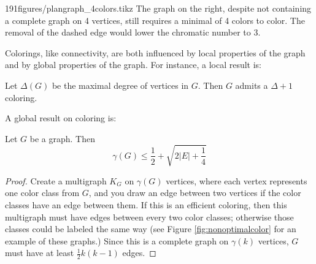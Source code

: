 \begin{examplefigureenv}{191figures/plangraph_4colors.tikz}
  The graph on the right, despite not containing a complete graph on 4 vertices, still requires a minimal of 4 colors to color. The removal of the dashed edge would lower the chromatic number to 3. 
\end{examplefigureenv}
Colorings, like connectivity, are both influenced by local properties of the graph and by global properties of the graph. For instance, a local result is:
\begin{claim}
 Let $\Delta(G)$ be the maximal degree of vertices in $G$. Then $G$ admits a $\Delta+1$ coloring. 
\end{claim}
A global result on coloring is:
\begin{claim}
 Let $G$ be a graph. Then 
 \[\gamma(G)\leq \frac{1}{2}+\sqrt{2|E|+\frac{1}{4}}\]
\end{claim}
\begin{proof}
 Create a multigraph $K_G$ on $\gamma(G)$ vertices, where each vertex represents one color class from $G$, and you draw an edge between two vertices if the color classes have an edge between them. If this is an efficient coloring, then this multigraph must have edges between every two color classes; otherwise those classes could be labeled the same way (see Figure \ref{fig:nonoptimalcolor} for an example of these graphs.) Since this is a complete graph on $\gamma(k)$ vertices, $G$ must have at least $\frac{1}{2}k(k-1)$ edges. 
\end{proof}
